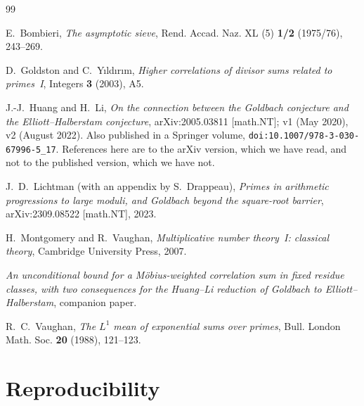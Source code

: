 \documentclass[11pt,a4paper]{article}
\theoremstyle{plain}
\theoremstyle{definition}
\theoremstyle{remark}
\begin{document}
\begin{thebibliography}{99}

 E.~Bombieri, \emph{The asymptotic sieve},
Rend. Accad. Naz. XL (5) \textbf{1/2} (1975/76), 243--269.

 D.~Goldston and C.~Y{\i}ld{\i}r{\i}m,
\emph{Higher correlations of divisor sums related to primes~I},
Integers \textbf{3} (2003), A5.

 J.-J.~Huang and H.~Li, \emph{On the connection between
the Goldbach conjecture and the Elliott--Halberstam conjecture},
arXiv:2005.03811 [math.NT]; v1 (May 2020), v2 (August 2022). Also
published in a Springer volume,
\texttt{doi:10.1007/978-3-030-67996-5\_17}. References here are to the
arXiv version, which we have read, and not to the published version,
which we have not.

 J.~D.~Lichtman (with an appendix by S.~Drappeau),
\emph{Primes in arithmetic progressions to large moduli, and Goldbach
beyond the square-root barrier}, arXiv:2309.08522 [math.NT], 2023.

 H.~Montgomery and R.~Vaughan, \emph{Multiplicative number
theory~I: classical theory}, Cambridge University Press, 2007.

 \emph{An unconditional bound for a M\"obius-weighted
correlation sum in fixed residue classes, with two consequences for
the Huang--Li reduction of Goldbach to Elliott--Halberstam},
companion paper.

 R.~C.~Vaughan, \emph{The $L^1$ mean of exponential
sums over primes}, Bull. London Math. Soc. \textbf{20} (1988),
121--123.

\end{thebibliography}

\appendix
\section{Reproducibility}
\end{document}
